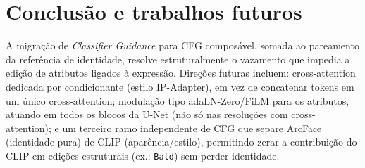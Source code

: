\documentclass[9pt,twocolumn]{extarticle}
\begin{document}
\section{Conclusão e trabalhos futuros}
A migração de \emph{Classifier Guidance} para CFG composável, somada ao pareamento da referência de identidade, resolve estruturalmente o vazamento que impedia a edição de atributos ligados à expressão. Direções futuras incluem: cross-attention dedicada por condicionante (estilo IP-Adapter), em vez de concatenar tokens em um único cross-attention; modulação tipo adaLN-Zero/FiLM para os atributos, atuando em todos os blocos da U-Net (não só nas resoluções com cross-attention); e um terceiro ramo independente de CFG que separe ArcFace (identidade pura) de CLIP (aparência/estilo), permitindo zerar a contribuição do CLIP em edições estruturais (ex.: \texttt{Bald}) sem perder identidade.
\end{document}
